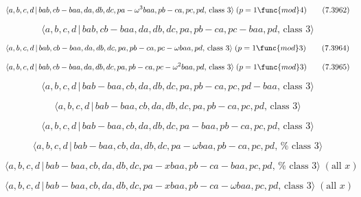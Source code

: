 \documentclass[10pt]{article}
\begin{document}
\begin{equation}
\langle a,b,c,d\,|\,bab,cb-baa,da,db,dc,pa-\omega ^{3}baa,pb-ca,pc,pd,\,%
\text{class }3\rangle \;(p=1\func{mod}4)  \tag{7.3962}
\end{equation}

\begin{equation}
\langle a,b,c,d\,|\,bab,cb-baa,da,db,dc,pa,pb-ca,pc-baa,pd,\,\text{class }%
3\rangle  \tag{7.3963}
\end{equation}

\begin{equation}
\langle a,b,c,d\,|\,bab,cb-baa,da,db,dc,pa,pb-ca,pc-\omega baa,pd,\,\text{%
class }3\rangle \;(p=1\func{mod}3)  \tag{7.3964}
\end{equation}

\begin{equation}
\langle a,b,c,d\,|\,bab,cb-baa,da,db,dc,pa,pb-ca,pc-\omega ^{2}baa,pd,\,%
\text{class }3\rangle \;(p=1\func{mod}3)  \tag{7.3965}
\end{equation}

\begin{equation}
\langle a,b,c,d\,|\,bab-baa,cb,da,db,dc,pa,pb-ca,pc,pd-baa,\,\text{class }%
3\rangle  \tag{7.3966}
\end{equation}

\begin{equation}
\langle a,b,c,d\,|\,bab-baa,cb,da,db,dc,pa,pb-ca,pc,pd,\,\text{class }%
3\rangle  \tag{7.3967}
\end{equation}

\begin{equation}
\langle a,b,c,d\,|\,bab-baa,cb,da,db,dc,pa-baa,pb-ca,pc,pd,\,\text{class }%
3\rangle  \tag{7.3968}
\end{equation}

\begin{equation}
\langle a,b,c,d\,|\,bab-baa,cb,da,db,dc,pa-\omega baa,pb-ca,pc,pd,\,\text{%
class }3\rangle  \tag{7.3969}
\end{equation}

\begin{equation}
\langle a,b,c,d\,|\,bab-baa,cb,da,db,dc,pa-xbaa,pb-ca-baa,pc,pd,\,\text{%
class }3\rangle \;(\text{all }x)  \tag{7.3970}
\end{equation}

\begin{equation}
\langle a,b,c,d\,|\,bab-baa,cb,da,db,dc,pa-xbaa,pb-ca-\omega baa,pc,pd,\,%
\text{class }3\rangle \;(\text{all }x)  \tag{7.3971}
\end{equation}
\end{document}
